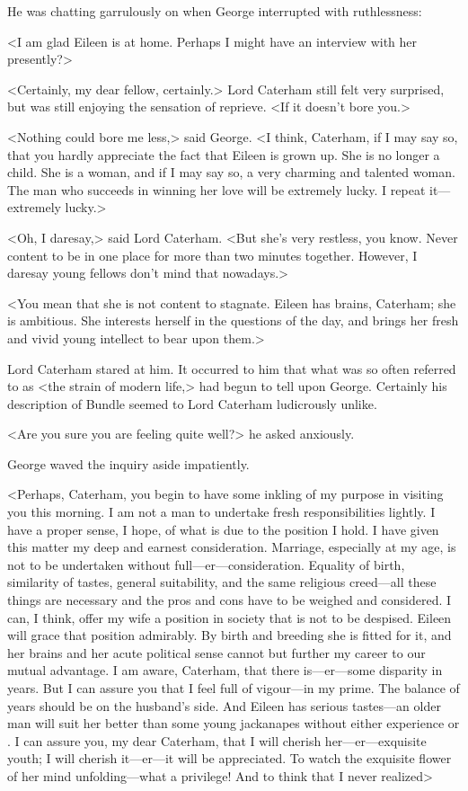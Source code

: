 He was chatting garrulously on when George interrupted with ruthlessness:

<I am glad Eileen is at home. Perhaps I might have an interview with her presently?>

<Certainly, my dear fellow, certainly.> Lord Caterham still felt very surprised, but was still enjoying the sensation of reprieve. <If it doesn't bore you.>

<Nothing could bore me less,> said George. <I think, Caterham, if I may say so, that you hardly appreciate the fact that Eileen is grown up. She is no longer a child. She is a woman, and if I may say so, a very charming and talented woman. The man who succeeds in winning her love will be extremely lucky. I repeat it—extremely lucky.>

<Oh, I daresay,> said Lord Caterham. <But she's very restless, you know. Never content to be in one place for more than two minutes together. However, I daresay young fellows don't mind that nowadays.>

<You mean that she is not content to stagnate. Eileen has brains, Caterham; she is ambitious. She interests herself in the questions of the day, and brings her fresh and vivid young intellect to bear upon them.>

Lord Caterham stared at him. It occurred to him that what was so often referred to as <the strain of modern life,> had begun to tell upon George. Certainly his description of Bundle seemed to Lord Caterham ludicrously unlike.

<Are you sure you are feeling quite well?> he asked anxiously.

George waved the inquiry aside impatiently.

<Perhaps, Caterham, you begin to have some inkling of my purpose in visiting you this morning. I am not a man to undertake fresh responsibilities lightly. I have a proper sense, I hope, of what is due to the position I hold. I have given this matter my deep and earnest consideration. Marriage, especially at my age, is not to be undertaken without full—er—consideration. Equality of birth, similarity of tastes, general suitability, and the same religious creed—all these things are necessary and the pros and cons have to be weighed and considered. I can, I think, offer my wife a position in society that is not to be despised. Eileen will grace that position admirably. By birth and breeding she is fitted for it, and her brains and her acute political sense cannot but further my career to our mutual advantage. I am aware, Caterham, that there is—er—some disparity in years. But I can assure you that I feel full of vigour—in my prime. The balance of years should be on the husband's side. And Eileen has serious tastes—an older man will suit her better than some young jackanapes without either experience or . I can assure you, my dear Caterham, that I will cherish her—er—exquisite youth; I will cherish it—er—it will be appreciated. To watch the exquisite flower of her mind unfolding—what a privilege! And to think that I never realized\longdash>

